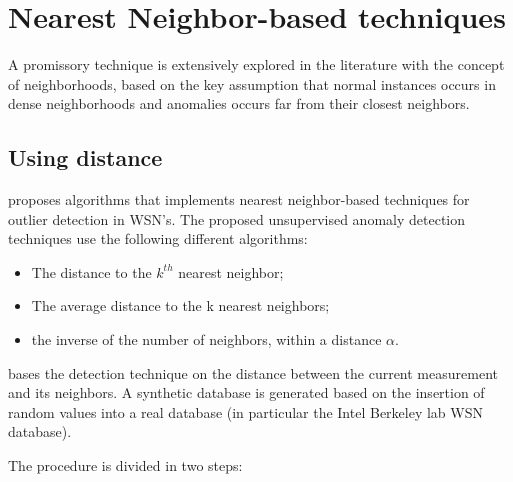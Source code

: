\newpage

\section{Nearest Neighbor-based techniques}

\label{sec:nnbased}



A promissory technique is extensively explored in the literature with the concept of neighborhoods, based on the key assumption that normal instances occurs in dense neighborhoods and anomalies occurs far from their closest neighbors.





\subsection{Using distance}



\cite{class:branch:2006} proposes algorithms that implements nearest neighbor-based techniques for outlier detection in WSN's. The proposed unsupervised anomaly detection techniques use the following different algorithms:



\begin{itemize}

	\setlength\itemsep{-0.5em}

	\item The distance to the $k^{th}$ nearest neighbor;

	\item The average distance to the k nearest neighbors;

	\item the inverse of the number of neighbors, within a distance $\alpha$.	

\end{itemize}



\cite{nn:abid:2016} bases the detection technique on the distance between the current measurement and its neighbors. A synthetic database is generated based on the insertion of random values into a real database (in particular the Intel Berkeley lab WSN database).

The procedure is divided in two steps: 

